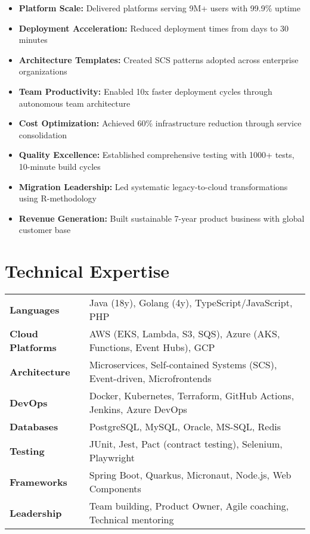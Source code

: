 \documentclass[11pt,a4paper]{article}
\newcommand{\achievement}[2]{\textbf{#1:} #2}
\begin{document}
\begin{itemize}
\item \achievement{Platform Scale}{Delivered platforms serving 9M+ users with 99.9\% uptime}
\item \achievement{Deployment Acceleration}{Reduced deployment times from days to 30 minutes}
\item \achievement{Architecture Templates}{Created SCS patterns adopted across enterprise organizations}
\item \achievement{Team Productivity}{Enabled 10x faster deployment cycles through autonomous team architecture}
\item \achievement{Cost Optimization}{Achieved 60\% infrastructure reduction through service consolidation}
\item \achievement{Quality Excellence}{Established comprehensive testing with 1000+ tests, 10-minute build cycles}
\item \achievement{Migration Leadership}{Led systematic legacy-to-cloud transformations using R-methodology}
\item \achievement{Revenue Generation}{Built sustainable 7-year product business with global customer base}
\end{itemize}

\section{Technical Expertise}

\begin{tabularx}{\textwidth}{>{\bfseries}p{3.5cm}X}
Languages & Java (18y), Golang (4y), TypeScript/JavaScript, PHP \\
Cloud Platforms & AWS (EKS, Lambda, S3, SQS), Azure (AKS, Functions, Event Hubs), GCP \\
Architecture & Microservices, Self-contained Systems (SCS), Event-driven, Microfrontends \\
DevOps & Docker, Kubernetes, Terraform, GitHub Actions, Jenkins, Azure DevOps \\
Databases & PostgreSQL, MySQL, Oracle, MS-SQL, Redis \\
Testing & JUnit, Jest, Pact (contract testing), Selenium, Playwright \\
Frameworks & Spring Boot, Quarkus, Micronaut, Node.js, Web Components \\
Leadership & Team building, Product Owner, Agile coaching, Technical mentoring \\
\end{tabularx}
\end{document}

